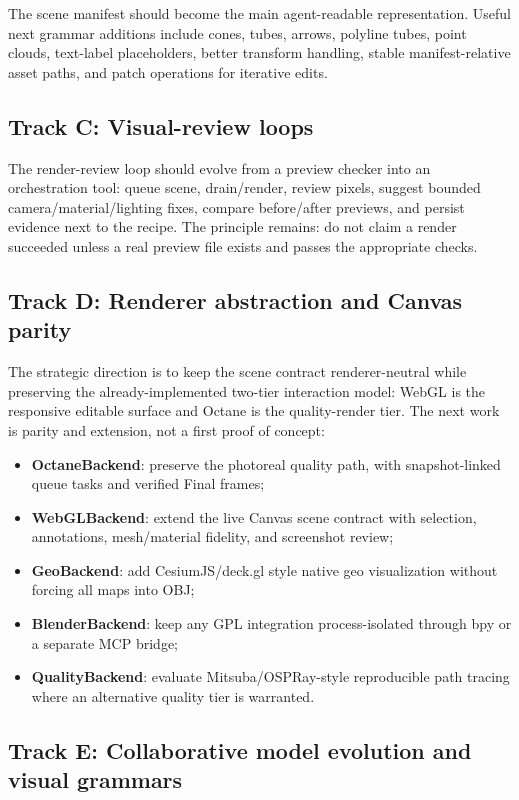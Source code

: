 \documentclass[11pt,a4paper]{article}
\begin{document}
The scene manifest should become the main agent-readable representation. Useful next grammar additions include cones, tubes, arrows, polyline tubes, point clouds, text-label placeholders, better transform handling, stable manifest-relative asset paths, and patch operations for iterative edits.

\subsection{Track C: Visual-review loops}

The render-review loop should evolve from a preview checker into an orchestration tool: queue scene, drain/render, review pixels, suggest bounded camera/material/lighting fixes, compare before/after previews, and persist evidence next to the recipe. The principle remains: do not claim a render succeeded unless a real preview file exists and passes the appropriate checks.

\subsection{Track D: Renderer abstraction and Canvas parity}

The strategic direction is to keep the scene contract renderer-neutral while
preserving the already-implemented two-tier interaction model: WebGL is the
responsive editable surface and Octane is the quality-render tier. The next
work is parity and extension, not a first proof of concept:

\begin{itemize}[leftmargin=*]
  \item \textbf{OctaneBackend}: preserve the photoreal quality path, with snapshot-linked queue tasks and verified Final frames;
  \item \textbf{WebGLBackend}: extend the live Canvas scene contract with selection, annotations, mesh/material fidelity, and screenshot review;
  \item \textbf{GeoBackend}: add CesiumJS/deck.gl style native geo visualization without forcing all maps into OBJ;
  \item \textbf{BlenderBackend}: keep any GPL integration process-isolated through bpy or a separate MCP bridge;
  \item \textbf{QualityBackend}: evaluate Mitsuba/OSPRay-style reproducible path tracing where an alternative quality tier is warranted.
\end{itemize}

\subsection{Track E: Collaborative model evolution and visual grammars}
\end{document}
